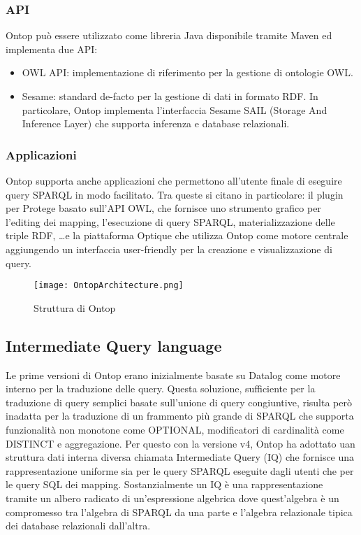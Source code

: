 \subsubsection*{API}
Ontop può essere utilizzato come libreria Java disponibile tramite Maven ed implementa due API:
\begin{itemize}
    \item OWL API: implementazione di riferimento per la gestione di ontologie OWL.
    \item Sesame: standard de-facto per la gestione di dati in formato RDF. In particolare, Ontop implementa l'interfaccia Sesame SAIL (Storage And Inference Layer) che supporta 
        inferenza e database relazionali.
\end{itemize}
\subsubsection*{Applicazioni}
Ontop supporta anche applicazioni che permettono all'utente finale di eseguire query SPARQL in modo facilitato. Tra queste si citano in particolare: il plugin per Protege basato sull'API OWL,
che fornisce uno strumento grafico per l'editing dei mapping, l'esecuzione di query SPARQL, materializzazione delle triple RDF, \dots e la piattaforma Optique che utilizza Ontop come motore centrale 
aggiungendo un interfaccia user-friendly per la creazione e visualizzazione di query.

\begin{figure}[ht]
    \centering
    \texttt{[image: OntopArchitecture.png]}
    \caption{Struttura di Ontop \cite{OntopArchitecture}}
    \label{fig:OntopArchitecture}
\end{figure}

\subsection{Intermediate Query language}
\label{sec:ontop_iq}
Le prime versioni di Ontop erano inizialmente basate su Datalog come motore interno per la traduzione delle query. 
Questa soluzione, sufficiente per la traduzione di query semplici basate sull'unione di query congiuntive, risulta però inadatta per la traduzione di un frammento più grande di SPARQL 
che supporta funzionalità non monotone come OPTIONAL, modificatori di cardinalità come DISTINCT e aggregazione. Per questo con la versione v4, Ontop ha adottato uan struttura dati interna diversa 
chiamata Intermediate Query (IQ) che fornisce una rappresentazione uniforme sia per le query SPARQL eseguite dagli utenti che per le query SQL dei mapping.
Sostanzialmente un IQ è una rappresentazione tramite un albero radicato di un'espressione algebrica dove quest'algebra è un compromesso tra l'algebra di SPARQL da una parte e l'algebra relazionale tipica 
dei database relazionali dall'altra. \cite{Ontop}

